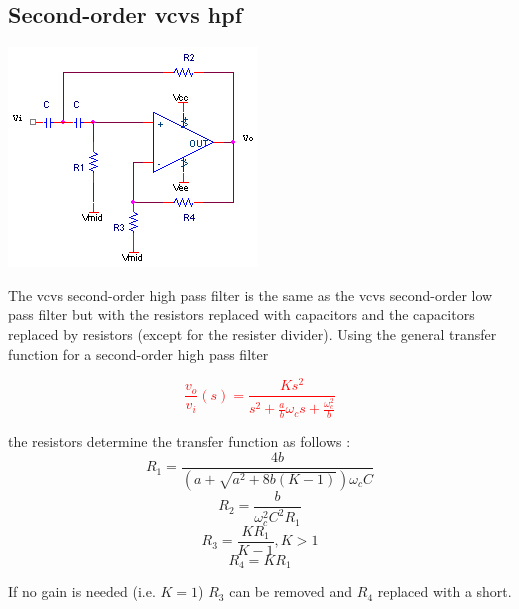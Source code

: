\subsection{Second-order \acs{vcvs} \acl{hpf}}
\begin{center}
	\includegraphics{schematics/2ndorder_vcvs_HPfilter.PNG}
\end{center}
The \ac{vcvs} second-order high pass filter is the same as the \ac{vcvs} second-order low pass filter but with the resistors replaced with capacitors and the capacitors replaced by resistors (except for the resister divider). Using the  general transfer function for a second-order high pass filter

\textcolor{red}{
\begin{equation}
\frac{v_{o}}{v_{i}}(s) = \frac{Ks^{2}}{s^{2} + \frac{a}{b}\omega_{c}s + \frac{\omega_{c}^{2}}{b}}
\label{eq:2ndorder_vcvs_HPfilter}
\end{equation}
}

the resistors determine the transfer function as follows \autocite[130-131]{op-amp-circuits-johnson}:
\begin{equation}
R_1 = \frac{4b}{(a+\sqrt{a^2 + 8b(K-1)})\omega_{c}C}
\end{equation}
\begin{equation}
R_2 = \frac{b}{\omega_{c}^2 C^2 R_1}
\end{equation}
\begin{equation}
R_3 = \frac{KR_1}{K-1}, K > 1
\end{equation}
\begin{equation}
R_4 = KR_1
\end{equation}

If no gain is needed (i.e. $K = 1$) $R_3$ can be removed and $R_4$ replaced with a short.

